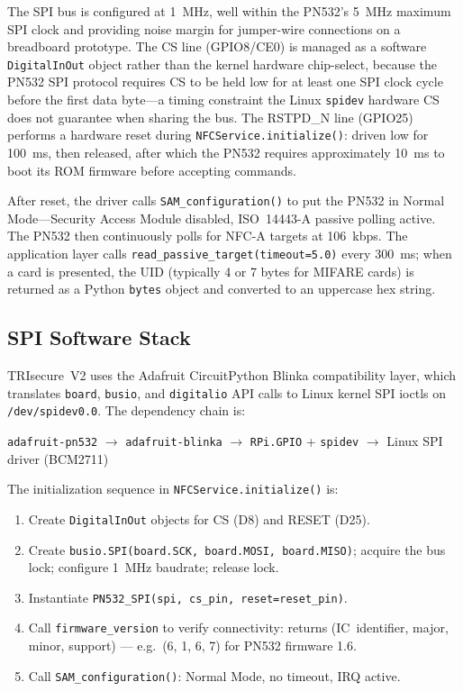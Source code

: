 \documentclass[pdflatex,sn-mathphys-num]{sn-jnl}%
\theoremstyle{thmstyleone}%
\theoremstyle{thmstyletwo}%
\theoremstyle{thmstylethree}%
\begin{document}
The SPI bus is configured at 1~MHz, well within the PN532's 5~MHz maximum SPI
clock and providing noise margin for jumper-wire connections on a breadboard
prototype. The CS line (GPIO8/CE0) is managed as a software
\texttt{DigitalInOut} object rather than the kernel hardware chip-select,
because the PN532 SPI protocol requires CS to be held low for at least one SPI
clock cycle before the first data byte---a timing constraint the Linux
\texttt{spidev} hardware CS does not guarantee when sharing the bus. The
RSTPD\_N line (GPIO25) performs a hardware reset during
\texttt{NFCService.initialize()}: driven low for 100~ms, then released, after
which the PN532 requires approximately 10~ms to boot its ROM firmware before
accepting commands.

After reset, the driver calls \texttt{SAM\_configuration()} to put the PN532
in Normal Mode---Security Access Module disabled, ISO~14443-A passive polling
active. The PN532 then continuously polls for NFC-A targets at 106~kbps. The
application layer calls \texttt{read\_passive\_target(timeout=5.0)} every
300~ms; when a card is presented, the UID (typically 4 or 7 bytes for MIFARE
cards) is returned as a Python \texttt{bytes} object and converted to an
uppercase hex string.

\subsection{SPI Software Stack}

TRIsecure~V2 uses the Adafruit CircuitPython Blinka compatibility layer, which
translates \texttt{board}, \texttt{busio}, and \texttt{digitalio} API calls to
Linux kernel SPI ioctls on \texttt{/dev/spidev0.0}. The dependency chain is:

\medskip
\noindent
\texttt{adafruit-pn532} $\to$ \texttt{adafruit-blinka} $\to$
\texttt{RPi.GPIO} + \texttt{spidev} $\to$ Linux SPI driver (BCM2711)
\medskip

\noindent The initialization sequence in \texttt{NFCService.initialize()} is:
\begin{enumerate}[label=\arabic*.,leftmargin=*,nosep]
  \item Create \texttt{DigitalInOut} objects for CS (D8) and RESET (D25).
  \item Create \texttt{busio.SPI(board.SCK, board.MOSI, board.MISO)};
        acquire the bus lock; configure 1~MHz baudrate; release lock.
  \item Instantiate \texttt{PN532\_SPI(spi, cs\_pin, reset=reset\_pin)}.
  \item Call \texttt{firmware\_version} to verify connectivity: returns
        (IC~identifier, major, minor, support) --- e.g.\ (6, 1, 6, 7)
        for PN532 firmware 1.6.
  \item Call \texttt{SAM\_configuration()}: Normal Mode, no timeout, IRQ
        active.
\end{enumerate}
\end{document}
